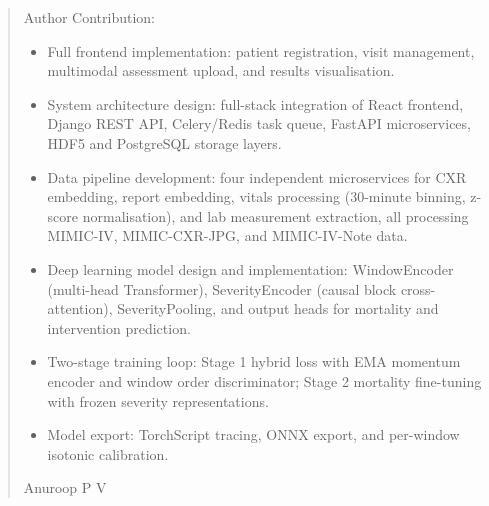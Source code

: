 \documentclass{fisatprojectfinal}
\begin{document}
\newpage
\renewcommand\abstractname{Contribution by Author}
\thispagestyle{plain}
\begin{abstract}
	\vspace{1 cm}
	Author  Contribution:  
    \begin{itemize}
        \item Full frontend implementation: patient registration, visit management, multimodal
assessment upload, and results visualisation.

        \item System architecture design: full-stack integration of React frontend, Django REST
API, Celery/Redis task queue, FastAPI microservices, HDF5 and PostgreSQL storage
layers.
        \item Data pipeline development: four independent microservices for CXR embedding,
report embedding, vitals processing (30-minute binning, z-score normalisation), and
lab measurement extraction, all processing MIMIC-IV, MIMIC-CXR-JPG, and
MIMIC-IV-Note data.
        \item Deep learning model design and implementation: WindowEncoder (multi-head
Transformer), SeverityEncoder (causal block cross-attention), SeverityPooling, and
output heads for mortality and intervention prediction.
        \item Two-stage training loop: Stage 1 hybrid loss with EMA momentum encoder and
window order discriminator; Stage 2 mortality fine-tuning with frozen severity
representations.
        \item Model export: TorchScript tracing, ONNX export, and per-window isotonic calibration.

    \end{itemize}
    
	
	\vspace{1cm}
	\begin{flushright}
		Anuroop P V
	\end{flushright}
\end{abstract}
\end{document}
